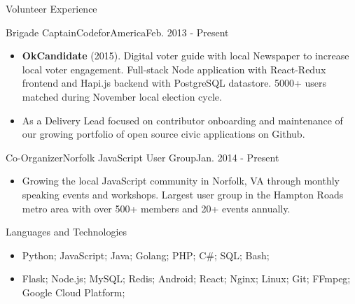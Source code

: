 \documentclass[]{mcdowellcv}
\begin{document}
    \begin{cvsection}{Volunteer Experience}
        \begin{cvsubsection}{Brigade Captain}{CodeforAmerica}{Feb. 2013 - Present}
            \begin{itemize}
                \item \textbf{OkCandidate} (2015). Digital voter guide with local Newspaper to increase local voter engagement. Full-stack Node application with React-Redux frontend and Hapi.js backend with PostgreSQL datastore. 5000+ users matched during November local election cycle.
                \item As a Delivery Lead focused on contributor onboarding and maintenance of our growing portfolio of open source civic applications on Github.
            \end{itemize}

        \end{cvsubsection}

        \begin{cvsubsection}{Co-Organizer}{Norfolk JavaScript User Group}{Jan. 2014 - Present}
            \begin{itemize}
                \item Growing the local JavaScript community in Norfolk, VA through monthly speaking events and workshops. Largest user group in the Hampton Roads metro area with over 500+ members and 20+ events annually.
            \end{itemize}
        \end{cvsubsection}

    \end{cvsection}

    \begin{cvsection}{Languages and Technologies}
        \begin{cvsubsection}{}{}{}
            \begin{itemize}
                \item Python; JavaScript; Java; Golang; PHP; C\#; SQL; Bash;
                \item Flask; Node.js; MySQL; Redis; Android; React; Nginx; Linux; Git; FFmpeg; Google Cloud Platform;
            \end{itemize}
        \end{cvsubsection}
    \end{cvsection}
\end{document}
